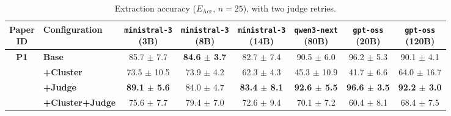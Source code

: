 \begin{table}[htbp]
    \centering
    \small
    \setlength{\tabcolsep}{4pt}
    \caption{Extraction accuracy ($E_{\text{Acc}}$, $n=25$), with two judge retries.}
    \begin{tabular}{c|l|cccccc}
        \toprule
        \makecell{\textbf{Paper} \\ \textbf{ID}} & \textbf{Configuration}& \makecell{\texttt{ministral-3} \\ (3B)} & \makecell{\texttt{ministral-3} \\ (8B)} & \makecell{\texttt{ministral-3} \\ (14B)} & \makecell{\texttt{qwen3-next} \\ (80B)} & \makecell{\texttt{gpt-oss} \\ (20B)} & \makecell{\texttt{gpt-oss} \\ (120B)} \\
        \hline
        
            \multirow{4}{*}{\textbf{P1}} 
            & \textbf{Base}& 85.7 $\pm$ 7.7 & \textbf{84.6 $\pm$ 3.7} & 82.7 $\pm$ 7.4 & 90.5 $\pm$ 6.0 & 96.2 $\pm$ 5.3 & 90.1 $\pm$ 4.1 \\
            & \textbf{+Cluster}& 73.5 $\pm$ 10.5 & 73.9 $\pm$ 4.2 & 62.3 $\pm$ 4.3 & 45.3 $\pm$ 10.9 & 41.7 $\pm$ 6.6 & 64.0 $\pm$ 16.7 \\
            & \textbf{+Judge}& \textbf{89.1 $\pm$ 5.6} & 84.0 $\pm$ 4.7 & \textbf{83.4 $\pm$ 8.1} & \textbf{92.6 $\pm$ 5.5} & \textbf{96.6 $\pm$ 3.5} & \textbf{92.2 $\pm$ 3.0} \\
            & \textbf{+Cluster+Judge}& 75.6 $\pm$ 7.7 & 79.4 $\pm$ 7.0 & 72.6 $\pm$ 9.4 & 70.1 $\pm$ 7.2 & 60.4 $\pm$ 8.1 & 68.4 $\pm$ 7.5 \\
            \hline
        
        \bottomrule
    \end{tabular}
    \label{tab:results_p1}
\end{table}